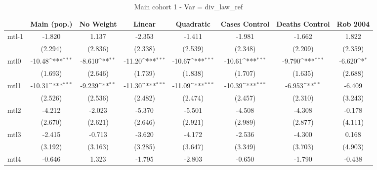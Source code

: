 \documentclass{article}
\begin{document}
{
\def\sym#1{\ifmmode^{#1}\else\(^{#1}\)\fi}
\begin{longtable}{l*{7}{c}}
\caption{Main cohort 1 - Var = div\_law\_ref}\\
\hline\hline\endfirsthead\hline\endhead\hline\endfoot\endlastfoot
                &\multicolumn{1}{c}{Main (pop.)}&\multicolumn{1}{c}{No Weight}&\multicolumn{1}{c}{Linear}&\multicolumn{1}{c}{Quadratic}&\multicolumn{1}{c}{Cases Control}&\multicolumn{1}{c}{Deaths Control}&\multicolumn{1}{c}{Rob 2004}\\
\hline
mtl-1           &   -1.820         &    1.137         &   -2.353         &   -1.411         &   -1.981         &   -1.662         &    1.822         \\
                &  (2.294)         &  (2.836)         &  (2.338)         &  (2.539)         &  (2.348)         &  (2.209)         &  (2.359)         \\
mtl0            &   -10.48\sym{***}&   -8.610\sym{**} &   -11.20\sym{***}&   -10.67\sym{***}&   -10.61\sym{***}&   -9.790\sym{***}&   -6.620\sym{*}  \\
                &  (1.693)         &  (2.646)         &  (1.739)         &  (1.838)         &  (1.707)         &  (1.635)         &  (2.688)         \\
mtl1            &   -10.31\sym{***}&   -9.239\sym{**} &   -11.30\sym{***}&   -11.09\sym{***}&   -10.39\sym{***}&   -6.953\sym{**} &   -6.409         \\
                &  (2.526)         &  (2.536)         &  (2.482)         &  (2.474)         &  (2.457)         &  (2.310)         &  (3.243)         \\
mtl2            &   -4.212         &   -2.023         &   -5.370         &   -5.501         &   -4.508         &   -4.308         &   -0.178         \\
                &  (2.670)         &  (2.621)         &  (2.646)         &  (2.921)         &  (2.989)         &  (2.877)         &  (4.111)         \\
mtl3            &   -2.415         &   -0.713         &   -3.620         &   -4.172         &   -2.536         &   -4.300         &    0.168         \\
                &  (3.192)         &  (3.163)         &  (3.285)         &  (3.647)         &  (3.349)         &  (3.703)         &  (4.903)         \\
mtl4            &   -0.646         &    1.323         &   -1.795         &   -2.803         &   -0.650         &   -1.790         &   -0.438         \\

\end{longtable}}
\end{document}
